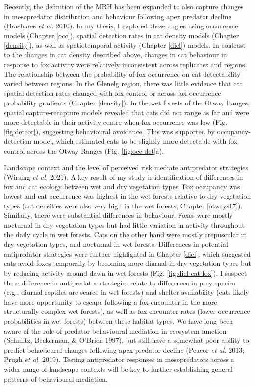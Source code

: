 \documentclass[11pt,a4paper,titlepage,twoside,openright]{style/unimelbthesis}
\begin{document}
\begin{mainmatter}
Recently, the definition of the MRH has been expanded to also capture changes in mesopredator distribution and behaviour following apex predator decline (Brashares \emph{et al.} 2010). In my thesis, I explored these angles using occurrence models (Chapter \ref{occ}), spatial detection rates in cat density models (Chapter \ref{density}), as well as spatiotemporal activity (Chapter \ref{diel}) models. In contrast to the changes in cat density described above, changes in cat behaviour in response to fox activity were relatively inconsistent across replicates and regions. The relationship between the probability of fox occurrence on cat detectability varied between regions. In the Glenelg region, there was little evidence that cat spatial detection rates changed with fox control or across fox occurrence probability gradients (Chapter \ref{density}). In the wet forests of the Otway Ranges, spatial capture-recapture models revealed that cats did not range as far and were more detectable in their activity centre when fox occurrence was low (Fig. \ref{fig:detcor}), suggesting behavioural avoidance. This was supported by occupancy-detection model, which estimated cats to be slightly more detectable with fox control across the Otway Ranges (Fig. \ref{fig:occ-det}a).

Landscape context and the level of perceived risk mediate antipredator strategies (Wirsing \emph{et al.} 2021). A key result of my study is identification of differences in fox and cat ecology between wet and dry vegetation types. Fox occupancy was lowest and cat occurrence was highest in the wet forests relative to dry vegetation types (cat densities were also very high in the wet forests; Chapter \ref{otways17}). Similarly, there were substantial differences in behaviour. Foxes were mostly nocturnal in dry vegetation types but had little variation in activity throughout the daily cycle in wet forests. Cats on the other hand were mostly crepuscular in dry vegetation types, and nocturnal in wet forests. Differences in potential antipredator strategies were further highlighted in Chapter \ref{diel}, which suggested cats avoid foxes temporally by becoming more diurnal in dry vegetation types but by reducing activity around dawn in wet forests (Fig. \ref{fig:diel-cat-fox}). I suspect these difference in antipredator strategies relate to differences in prey species (e.g., diurnal reptiles are scarce in wet forests) and shelter availability (cats likely have more opportunity to escape following a fox encounter in the more structurally complex wet forests), as well as fox encounter rates (lower occurrence probabilities in wet forests) between these habitat types. We have long been aware of the role of predator behavioural mediation in ecosystem function (Schmitz, Beckerman, \& O'Brien 1997), but still have a somewhat poor ability to predict behavioural changes following apex predator decline (Peacor \emph{et al.} 2013; Prugh \emph{et al.} 2019). Testing antipredator responses in mesopredators across a wider range of landscape contexts will be key to further establishing general patterns of behavioural mediation.


\end{mainmatter}
\end{document}

